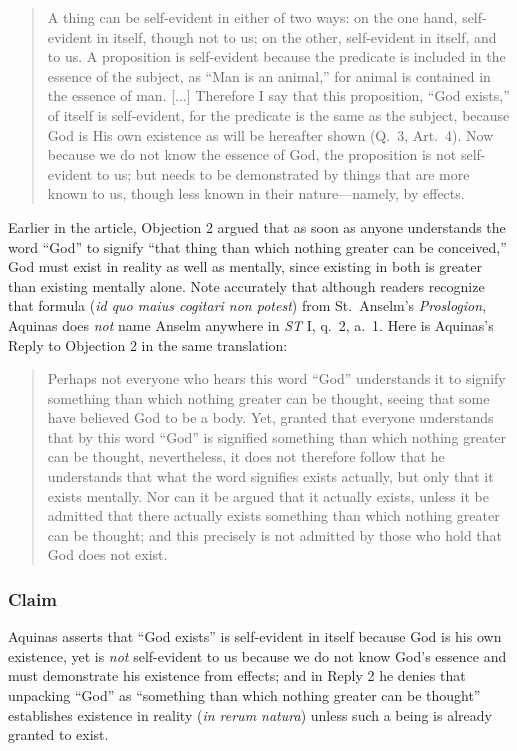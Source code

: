 \begin{quote}
A thing can be self-evident in either of two ways: on the one hand, self-evident in itself, though not to us; on the other, self-evident in itself, and to us. A proposition is self-evident because the predicate is included in the essence of the subject, as ``Man is an animal,'' for animal is contained in the essence of man. [...] Therefore I say that this proposition, ``God exists,'' of itself is self-evident, for the predicate is the same as the subject, because God is His own existence as will be hereafter shown (Q.\ 3, Art.\ 4). Now because we do not know the essence of God, the proposition is not self-evident to us; but needs to be demonstrated by things that are more known to us, though less known in their nature---namely, by effects.
\end{quote}

Earlier in the article, Objection 2 argued that as soon as anyone understands the word ``God'' to signify ``that thing than which nothing greater can be conceived,'' God must exist in reality as well as mentally, since existing in both is greater than existing mentally alone. Note accurately that although readers recognize that formula (\emph{id quo maius cogitari non potest}) from St.\ Anselm's \emph{Proslogion}, Aquinas does \emph{not} name Anselm anywhere in \emph{ST} I, q.\ 2, a.\ 1. Here is Aquinas's Reply to Objection 2 in the same translation:

\begin{quote}
Perhaps not everyone who hears this word ``God'' understands it to signify something than which nothing greater can be thought, seeing that some have believed God to be a body. Yet, granted that everyone understands that by this word ``God'' is signified something than which nothing greater can be thought, nevertheless, it does not therefore follow that he understands that what the word signifies exists actually, but only that it exists mentally. Nor can it be argued that it actually exists, unless it be admitted that there actually exists something than which nothing greater can be thought; and this precisely is not admitted by those who hold that God does not exist.
\end{quote}

\subsubsection*{Claim}
Aquinas asserts that ``God exists'' is self-evident in itself because God is his own existence, yet is \emph{not} self-evident to us because we do not know God's essence and must demonstrate his existence from effects; and in Reply 2 he denies that unpacking ``God'' as ``something than which nothing greater can be thought'' establishes existence in reality (\emph{in rerum natura}) unless such a being is already granted to exist.

